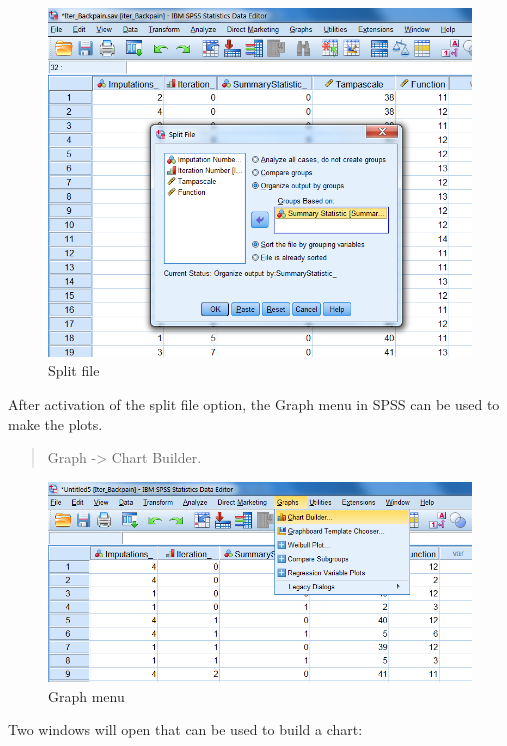 \documentclass[
]{book}
\begin{document}
\begin{figure}

{\centering \includegraphics[width=0.9\linewidth]{images/fig4.17} 

}

\caption{Split file}\label{fig:fig4-17}
\end{figure}

After activation of the split file option, the Graph menu in SPSS can be used to make the plots.

\begin{quote}
Graph -\textgreater{} Chart Builder.
\end{quote}

\begin{figure}

{\centering \includegraphics[width=0.9\linewidth]{images/fig4.13} 

}

\caption{Graph menu}\label{fig:fig4-13}
\end{figure}

Two windows will open that can be used to build a chart:
\end{document}
